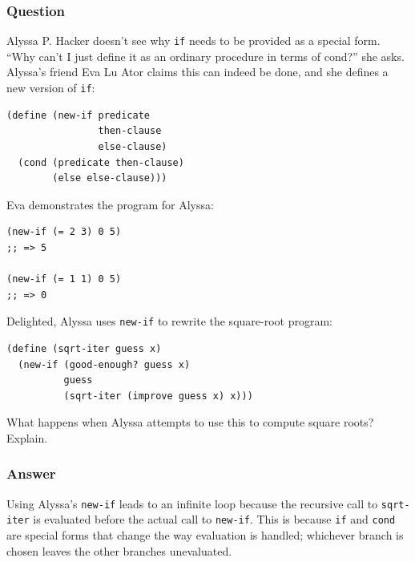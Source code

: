 \documentclass[final,fleqn,titlepage,twoside]{article}
\begin{document}
\subsubsection{Question}
\label{sec:org1798564}
Alyssa P. Hacker doesn't see why \texttt{if} needs to be provided as a
special form. ``Why can't I just define it as an ordinary procedure in terms of
cond?'' she asks. Alyssa's friend Eva Lu Ator claims this can indeed be done, and
she defines a new version of \texttt{if}:

\begin{verbatim}
(define (new-if predicate
                then-clause
                else-clause)
  (cond (predicate then-clause)
        (else else-clause)))
\end{verbatim}

Eva demonstrates the program for Alyssa:

\begin{verbatim}
(new-if (= 2 3) 0 5)
;; => 5

(new-if (= 1 1) 0 5)
;; => 0
\end{verbatim}

Delighted, Alyssa uses \texttt{new-if} to rewrite the square-root program:

\begin{verbatim}
(define (sqrt-iter guess x)
  (new-if (good-enough? guess x)
          guess
          (sqrt-iter (improve guess x) x)))
\end{verbatim}

What happens when Alyssa attempts to use this to compute square roots? Explain.

\subsubsection{Answer}
\label{sec:org6a59082}
Using Alyssa's \texttt{new-if} leads to an infinite loop because the
recursive call to \texttt{sqrt-iter} is evaluated before the actual call to
\texttt{new-if}. This is because \texttt{if} and \texttt{cond} are
special forms that change the way evaluation is handled; whichever branch is
chosen leaves the other branches unevaluated.
\end{document}
